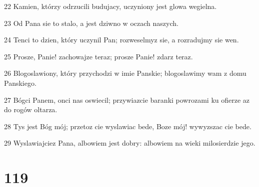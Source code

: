 \par 22 Kamien, którzy odrzucili budujacy, uczyniony jest glowa wegielna.
\par 23 Od Pana sie to stalo, a jest dziwno w oczach naszych.
\par 24 Tenci to dzien, który uczynil Pan; rozweselmyz sie, a rozradujmy sie wen.
\par 25 Prosze, Panie! zachowajze teraz; prosze Panie! zdarz teraz.
\par 26 Blogoslawiony, który przychodzi w imie Panskie; blogoslawimy wam z domu Panskiego.
\par 27 Bógci Panem, onci nas oswiecil; przywiazcie baranki powrozami ku ofierze az do rogów oltarza.
\par 28 Tys jest Bóg mój; przetoz cie wyslawiac bede, Boze mój! wywyzszac cie bede.
\par 29 Wyslawiajciez Pana, albowiem jest dobry: albowiem na wieki milosierdzie jego.

\chapter{119}

